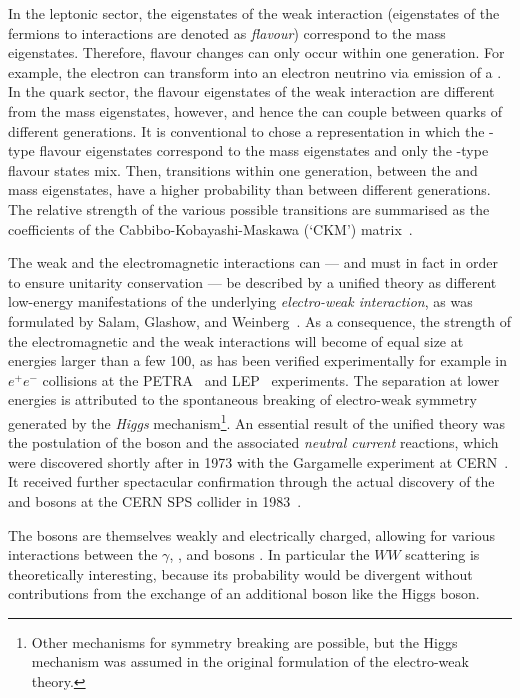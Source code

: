 In the leptonic sector, the eigenstates of the weak interaction (eigenstates of the fermions to interactions are denoted as \emph{flavour}) correspond to the mass eigenstates.
Therefore, flavour changes can only occur within one generation.
For example, the electron can transform into an electron neutrino via emission of a \Wm.
In the quark sector, the flavour eigenstates of the weak interaction are different from the mass eigenstates, however, and hence the \W can couple between quarks of different generations.
It is conventional to chose a representation in which the \qu-type flavour eigenstates correspond to the mass eigenstates and only the \qd-type flavour states mix.
Then, transitions within one generation, \ie between the \qu and \qd mass eigenstates, have a higher probability than between different generations.
The relative strength of the various possible transitions are summarised as the coefficients of the Cabbibo-Kobayashi-Maskawa (`CKM') matrix~\cite{PhysRevLett.10.531,PTP.49.652}.

The weak and the electromagnetic interactions can --- and must in fact in order to ensure unitarity conservation --- be described by a unified theory as different low-energy manifestations of the underlying \emph{electro-weak interaction}, as was formulated by Salam, Glashow, and Weinberg~\cite{Glashow:1961tr,Weinberg:1967tq}.
As a consequence, the strength of the electromagnetic and the weak interactions will become of equal size at energies larger than a few 100\gev, as has been verified experimentally for example in \mbox{$e^{+}e^{-}$} collisions at the PETRA~\cite{B198767} and LEP~\cite{bib:LEPEWKWG:ZPolse2005} experiments.
The separation at lower energies is attributed to the spontaneous breaking of electro-weak symmetry generated by the \emph{Higgs} mechanism\footnote{Other mechanisms for symmetry breaking are possible, but the Higgs mechanism was assumed in the original formulation of the electro-weak theory.}.
An essential result of the unified theory was the postulation of the \Z boson and the associated \emph{neutral current} reactions, which were discovered shortly after in 1973 with the Gargamelle experiment at CERN~\cite{Hasert:1973cr,Hasert:1973ff}.
It received further spectacular confirmation through the actual discovery of the \W and \Z bosons at the CERN SPS collider in 1983~\cite{Arnison1983103,Arnison1983398}.

The \W bosons are themselves weakly and electrically charged, allowing for various interactions between the $\gamma$, \Z, and \W bosons \addfig.
In particular the $WW$ scattering \addfig is theoretically interesting, because its probability would be divergent without contributions from the exchange of an additional boson like \eg the Higgs boson.


